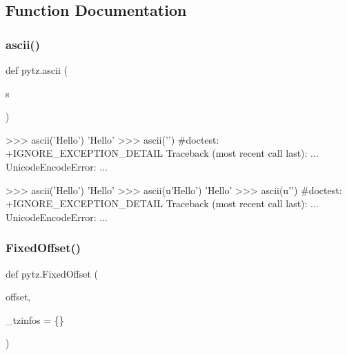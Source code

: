 \subsection{Function Documentation}
\mbox{\label{namespacepytz_a3b47f581b0f7a2e44fc39a9e56941618}} 
\subsubsection{\texorpdfstring{ascii()}{ascii()}}
{\footnotesize\ttfamily def pytz.\+ascii (\begin{DoxyParamCaption}\item[{}]{s }\end{DoxyParamCaption})}

\begin{DoxyVerb}>>> ascii('Hello')
'Hello'
>>> ascii('') #doctest: +IGNORE_EXCEPTION_DETAIL
Traceback (most recent call last):
    ...
UnicodeEncodeError: ...
\end{DoxyVerb}


\begin{DoxyVerb}>>> ascii('Hello')
'Hello'
>>> ascii(u'Hello')
'Hello'
>>> ascii(u'') #doctest: +IGNORE_EXCEPTION_DETAIL
Traceback (most recent call last):
    ...
UnicodeEncodeError: ...
\end{DoxyVerb}
 \mbox{\label{namespacepytz_af79016a547a0b7bae15ac4218644a224}} 
\subsubsection{\texorpdfstring{Fixed\+Offset()}{FixedOffset()}}
{\footnotesize\ttfamily def pytz.\+Fixed\+Offset (\begin{DoxyParamCaption}\item[{}]{offset,  }\item[{}]{\+\_\+tzinfos = {\ttfamily \{\}} }\end{DoxyParamCaption})}

